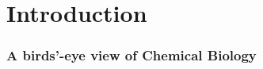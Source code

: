 \chapter{Introduction}
\label{introduction}
\newpage




\makeatletter
\newenvironment{figurehere}
{\def\@captype{figure}}
{}
\makeatother

\makeatletter
\newenvironment{Figure_modified}{%
\par\addvspace{12pt plus2pt}%
\def\@captype{figure}%
}{%
\par\addvspace{12pt plus2pt}%
}%

\newenvironment{Figure_modified2}{%
\par\addvspace{12pt plus2pt}%
\def\@captype{figure}%
\renewcommand{\@dblfloatplacement}{ht}%
\renewcommand{\@floatplacement}{ht}%
}{%
\par\addvspace{12pt plus2pt}%
}%

\long{}
\makeatother




\renewcommand{\thesubsection}{\thechapter.\arabic{subsection}}


\subsection{A birds'-eye view of Chemical Biology}
\label{Introduction_birds}

